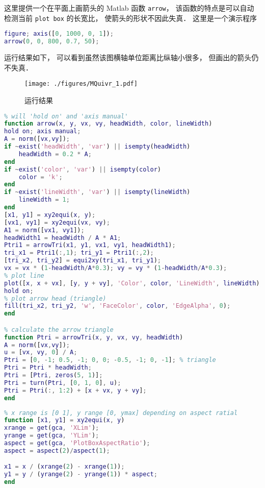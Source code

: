 

这里提供一个在平面上画箭头的 Matlab 函数 \verb|arrow|， 该函数的特点是可以自动检测当前 \verb|plot box| 的长宽比， 使箭头的形状不因此失真． 这里是一个演示程序
\begin{lstlisting}[language=matlab]
figure; axis([0, 1000, 0, 1]);
arrow(0, 0, 800, 0.7, 50);
\end{lstlisting}
运行结果如下， 可以看到虽然该图横轴单位距离比纵轴小很多， 但画出的箭头仍不失真．
\begin{figure}[ht]
\centering
\texttt{[image: ./figures/MQuivr\_1.pdf]}
\caption{运行结果} \label{MQuivr_fig1}
\end{figure}

\begin{lstlisting}[language=matlab, caption=arrow.m]
% plot arrow without distortion by getting current aspect ratio
% will 'hold on' and 'axis manual'
function arrow(x, y, vx, vy, headWidth, color, lineWidth)
hold on; axis manual;
A = norm([vx,vy]);
if ~exist('headWidth', 'var') || isempty(headWidth)
    headWidth = 0.2 * A;
end
if ~exist('color', 'var') || isempty(color)
    color = 'k';
end
if ~exist('lineWidth', 'var') || isempty(lineWidth)
    lineWidth = 1;
end
[x1, y1] = xy2equi(x, y);
[vx1, vy1] = xy2equi(vx, vy);
A1 = norm([vx1, vy1]);
headWidth1 = headWidth / A * A1;
Ptri1 = arrowTri(x1, y1, vx1, vy1, headWidth1);
tri_x1 = Ptri1(:,1); tri_y1 = Ptri1(:,2);
[tri_x2, tri_y2] = equi2xy(tri_x1, tri_y1);
vx = vx * (1-headWidth/A*0.3); vy = vy * (1-headWidth/A*0.3);
% plot line
plot([x, x + vx], [y, y + vy], 'Color', color, 'LineWidth', lineWidth);
hold on;
% plot arrow head (triangle)
fill(tri_x2, tri_y2, 'w', 'FaceColor', color, 'EdgeAlpha', 0);
end

% calculate the arrow triangle
function Ptri = arrowTri(x, y, vx, vy, headWidth)
A = norm([vx,vy]);
u = [vx, vy, 0] / A;
Ptri = [0, -1; 0.5, -1; 0, 0; -0.5, -1; 0, -1]; % triangle
Ptri = Ptri * headWidth;
Ptri = [Ptri, zeros(5, 1)];
Ptri = turn(Ptri, [0, 1, 0], u);
Ptri = Ptri(:, 1:2) + [x + vx, y + vy];
end
\end{lstlisting}

\begin{lstlisting}[language=matlab, caption=xy2equi.m]
% map x, y coordinates to x1, y1 with equal axis
% x range is [0 1], y range [0, ymax] depending on aspect ratial
function [x1, y1] = xy2equi(x, y)
xrange = get(gca, 'XLim');
yrange = get(gca, 'YLim');
aspect = get(gca, 'PlotBoxAspectRatio');
aspect = aspect(2)/aspect(1);

x1 = x / (xrange(2) - xrange(1));
y1 = y / (yrange(2) - yrange(1)) * aspect;
end
\end{lstlisting}

